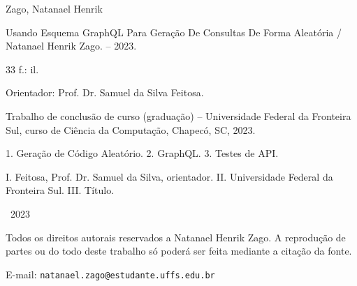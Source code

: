 \begin{pretextual}{}
\vspace*{2cm}
\noindent
\begin{minipage}{\linewidth}
\small
Zago, Natanael Henrik

\hspace*{1em}Usando Esquema GraphQL Para Geração De Consultas De Forma Aleatória / Natanael Henrik Zago. -- 2023.

\hspace*{1em}33 f.: il.

\hspace*{1em}Orientador: Prof. Dr. Samuel da Silva Feitosa.

\hspace*{1em}Trabalho de conclusão de curso (graduação) -- Universidade Federal da Fronteira Sul, curso de Ciência da Computação, Chapecó, SC, 2023.

\hspace*{1em}1. Geração de Código Aleatório. 2. GraphQL. 3. Testes de API.

I. Feitosa, Prof. Dr. Samuel da Silva, orientador. II. Universidade Federal da Fronteira Sul. III. Título.
\end{minipage}
\vfill
\noindent\textcopyright\ 2023

\noindent Todos os direitos autorais reservados a Natanael Henrik Zago. A reprodução de partes ou do todo deste trabalho só poderá ser feita mediante a citação da fonte.

\noindent E-mail: \texttt{natanael.zago@estudante.uffs.edu.br}
\end{pretextual}
